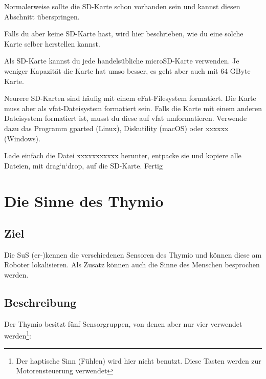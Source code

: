 \documentclass[12pt]{article}
\begin{document}
Normalerweise sollte die SD-Karte schon vorhanden sein und kannst diesen Abschnitt überspringen.
 
Falls du aber keine SD-Karte hast, wird hier beschrieben, wie du eine solche Karte selber herstellen kannst.

Als SD-Karte kannst du jede handelsübliche microSD-Karte verwenden. Je weniger Kapazität die Karte hat umso besser, es geht aber auch mit 64 GByte Karte.

Neurere SD-Karten sind häufig mit einem eFat-Filesystem formatiert. Die Karte muss aber als vfat-Dateisystem formatiert sein. Falls die Karte mit einem anderen Dateisystem formatiert ist, musst du diese auf vfat umformatieren. Verwende dazu das Programm gparted (Linux), Diskutility (macOS) oder xxxxxx (Windows).

Lade einfach die Datei xxxxxxxxxxx herunter, entpacke sie und kopiere alle Dateien, mit drag‘n‘drop, auf die SD-Karte. Fertig

\newpage

\section*{Die Sinne des Thymio}

\subsection*{Ziel}

Die SuS (er-)kennen die verschiedenen Sensoren des Thymio und können diese am Roboter lokalisieren. Als Zusatz können auch die Sinne des Menschen besprochen werden.

\subsection*{Beschreibung}

Der Thymio besitzt fünf Sensorgruppen, von denen aber nur vier verwendet werden\footnote{Der haptische Sinn (Fühlen) wird hier nicht benutzt. Diese Tasten werden zur Motorensteuerung verwendet}:
\end{document}
